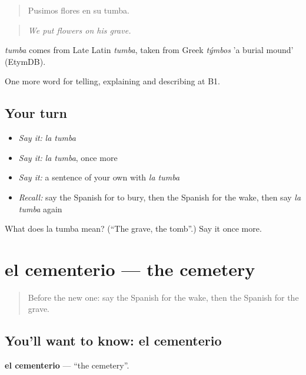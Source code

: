\begin{quote}
Pusimos flores en su tumba.
\end{quote}

\begin{quote}
\emph{We put flowers on his grave.}
\end{quote}

\begin{cousinweb}
\emph{tumba} comes from Late Latin \emph{tumba}, taken from Greek \emph{týmbos} 'a burial mound' (EtymDB).
\end{cousinweb}

\begin{grammarlens}[title={What you've built}]
One more word for telling, explaining and describing at B1.
\end{grammarlens}

\subsection*{Your turn}
\begin{itemize}
\raggedright
  \item \emph{Say it:} \emph{la tumba}
  \item \emph{Say it:} \emph{la tumba}, once more
  \item \emph{Say it:} a sentence of your own with \emph{la tumba}
  \item \emph{Recall:} say the Spanish for to bury, then the Spanish for the wake, then say \emph{la tumba} again
\end{itemize}

\begin{tcolorbox}[breakable,colback=teal!4,colframe=teal!35!black,title={Before you move on}]
What does la tumba mean? (\textquotedblleft{}The grave, the tomb\textquotedblright{}.) Say it once more.
\end{tcolorbox}
\section[el cementerio]{el cementerio — the cemetery}

\label{lesson:ES-C556-cementerio}



\begin{quote}
Before the new one: say the Spanish for the wake, then the Spanish for the grave.
\end{quote}

\subsection*{You'll want to know: el cementerio}
\textbf{el cementerio} — \textquotedblleft{}the cemetery\textquotedblright{}.

